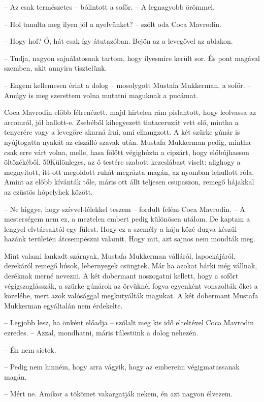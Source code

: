 \documentclass{IEEEtran}
\begin{document}
– Az csak természetes – bólintott a sofőr. – A legnagyobb örömmel.

– Hol tanulta meg ilyen jól a nyelvünket? – szólt oda Coca Mavrodin.

– Hogy hol? Ó, hát csak így átutazóban. Bejön az a levegővel az ablakon.

– Tudja, nagyon sajnálatosnak tartom, hogy ilyesmire került sor. És pont
magával szemben, akit annyira tisztelünk.

– Engem kellemesen érint a dolog – mosolygott Mustafa Mukkerman, a sofőr. –
Amúgy is meg szerettem volna mutatni maguknak a pucámat.

Coca Mavrodin előbb félrenézett, majd hirtelen rám pislantott, hogy leolvassa
az arcomról, jól hallott-e. Zsebéből kihegyezett tintaceruzát vett elő, mintha
a tenyerére vagy a levegőre akarná írni, ami elhangzott. A két szürke gúnár is
nyújtogatta nyakát az elszálló szavak után. Mustafa Mukkerman pedig, mintha
csak erre várt volna, melle, hasa fölött végighúzta a cipzárt, hogy
előbújhasson öltözékéből. 50Különleges, az ő testére szabott kezeslábast
viselt: alighogy a megnyitott, itt-ott megoldott ruhát megrázta magán, az
nyomban lehullott róla. Amint az előbb kívánták tőle, máris ott állt teljesen
csupaszon, remegő hájakkal az ezüstös hópelyhek között.

– Ne higgye, hogy szívvel-lélekkel teszem – fordult felém Coca Mavrodin. – A
mesterségem nem ez, a meztelen embert pedig különösen utálom. De kaptam a
lengyel elvtársaktól egy fülest. Hogy ez a személy a hája közé dugva készül
hazánk területén átcsempészni valamit. Hogy mit, azt sajnos nem mondták meg.

Mint valami lankadt szárnyak, Mustafa Mukkerman válláról, lapockájáról,
derekáról remegő húsok, lebernyegek csüngtek. Már ha azokat bárki még vállnak,
deréknak merné nevezni. A két dobermant noszogatni kellett, hogy a sofőrt
végigszaglásszák, a szürke gúnárok az örvüknél fogva egyenként vonszolták őket
a közelébe, mert azok valósággal megkutyálták magukat. A két dobermant Mustafa
Mukkerman egyáltalán nem érdekelte.

– Legjobb lesz, ha önként előadja – szólalt meg kis idő elteltével Coca
Mavrodin ezredes. – Azzal, mondhatni, máris túlestünk a dolog nehezén.

– Én nem sietek.

– Pedig nem hinném, hogy arra vágyik, hogy az embereim végigmatassanak magán.

– Mért ne. Amikor a tökömet vakargatják nekem, én azt nagyon élvezem.
\end{document}

